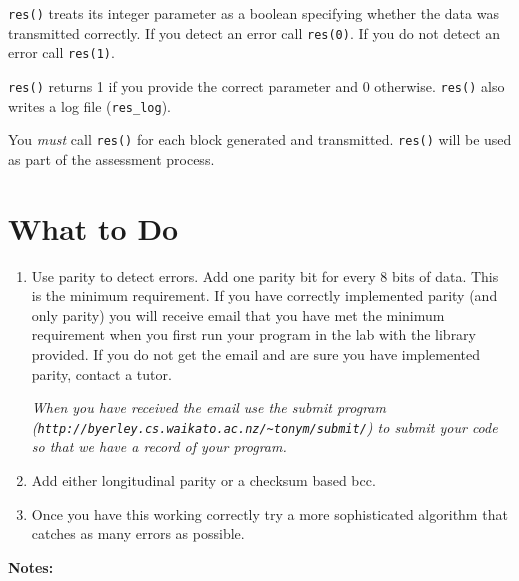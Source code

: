 \documentclass[a4paper,10pt]{article}
\begin{document}
\verb+res()+ treats its integer parameter as a boolean specifying
whether the data was transmitted correctly.  If you detect an error
call \verb+res(0)+.  If you do not detect an error call \verb+res(1)+.

\verb+res()+ returns 1 if you provide the correct parameter and 0 otherwise.
\verb+res()+ also writes a log file (\verb+res_log+).

You {\em must} call \verb+res()+ for each block generated and
transmitted.  \verb+res()+ will be used as part of the assessment
process.


\section{What to Do}

\begin{enumerate}
\item Use parity to detect errors.  Add one parity bit for every 8
      bits of data.  This is the minimum requirement.  If you have
      correctly implemented parity (and only parity) you will receive
      email that you have met the minimum requirement when you first
      run your program in the lab with the library provided.  If you
      do not get the email and are sure you have implemented parity,
      contact a tutor.

      {\em When you have received the email use the submit program\\
      (\verb+http://byerley.cs.waikato.ac.nz/~tonym/submit/+) to
      submit your code so that we have a record of your program.}

\item Add either longitudinal parity or a checksum based bcc.

\item Once you have this working correctly try a more sophisticated
      algorithm that catches as many errors as possible.  

\end{enumerate}

{\bf Notes:}
\end{document}

